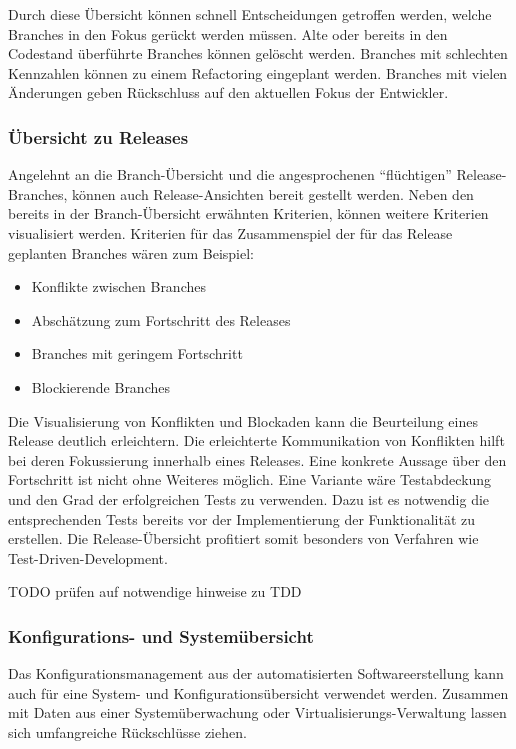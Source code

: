 Durch diese Übersicht können schnell Entscheidungen getroffen werden, welche Branches in den Fokus gerückt werden müssen. Alte oder bereits in den Codestand überführte Branches können gelöscht werden. Branches mit schlechten Kennzahlen können zu einem Refactoring eingeplant werden. Branches mit vielen Änderungen geben Rückschluss auf den aktuellen Fokus der Entwickler. 

\subsubsection{Übersicht zu Releases}

Angelehnt an die Branch-Übersicht und die angesprochenen ``flüchtigen'' Release-Branches, können auch Release-Ansichten bereit gestellt werden. Neben den bereits in der Branch-Übersicht erwähnten Kriterien, können weitere Kriterien visualisiert werden. Kriterien für das Zusammenspiel der für das Release geplanten Branches wären zum Beispiel:
\begin{itemize}
\item Konflikte zwischen Branches
\item Abschätzung zum Fortschritt des Releases
\item Branches mit geringem Fortschritt
\item Blockierende Branches
\end{itemize}

Die Visualisierung von Konflikten und Blockaden kann die Beurteilung eines Release deutlich erleichtern. Die erleichterte Kommunikation von Konflikten hilft bei deren Fokussierung innerhalb eines Releases. Eine konkrete Aussage über den Fortschritt ist nicht ohne Weiteres möglich. Eine Variante wäre Testabdeckung und den Grad der erfolgreichen Tests zu verwenden. Dazu ist es notwendig die entsprechenden Tests bereits vor der Implementierung der Funktionalität zu erstellen. Die Release-Übersicht profitiert somit besonders von Verfahren wie Test-Driven-Development.

TODO prüfen auf notwendige hinweise zu TDD

\subsubsection{Konfigurations- und Systemübersicht}
\label{subsubsec:configuration-system-overview}

Das Konfigurationsmanagement aus der automatisierten Softwareerstellung kann auch für eine System- und Konfigurationsübersicht verwendet werden. Zusammen mit Daten aus einer Systemüberwachung oder Virtualisierungs-Verwaltung lassen sich umfangreiche Rückschlüsse ziehen. 

